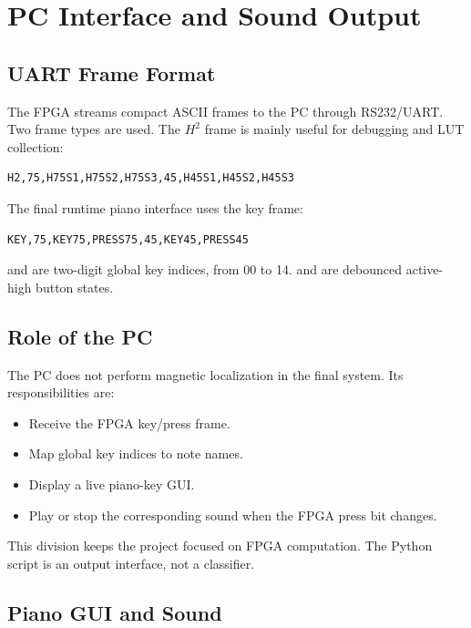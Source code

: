 \section{PC Interface and Sound Output}
\label{sec:pc_interface}

\subsection{UART Frame Format}

The FPGA streams compact ASCII frames to the PC through RS232/UART. Two frame types are used. The $H^2$ frame is mainly useful for debugging and LUT collection:

\begin{lstlisting}
H2,75,H75S1,H75S2,H75S3,45,H45S1,H45S2,H45S3
\end{lstlisting}

The final runtime piano interface uses the key frame:

\begin{lstlisting}
KEY,75,KEY75,PRESS75,45,KEY45,PRESS45
\end{lstlisting}

 and  are two-digit global key indices, from 00 to 14.  and  are debounced active-high button states.

\subsection{Role of the PC}

The PC does not perform magnetic localization in the final system. Its responsibilities are:

\begin{itemize}
    \item Receive the FPGA key/press frame.
    \item Map global key indices to note names.
    \item Display a live piano-key GUI.
    \item Play or stop the corresponding sound when the FPGA press bit changes.
\end{itemize}

This division keeps the project focused on FPGA computation. The Python script is an output interface, not a classifier.

\subsection{Piano GUI and Sound}

